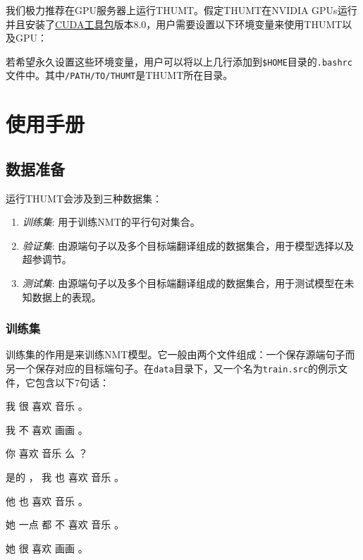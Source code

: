 \documentclass{article}
\begin{document}
我们极力推荐在GPU服务器上运行THUMT。假定THUMT在NVIDIA GPUs运行并且安装了\href{https://developer.nvidia.com/cuda-toolkit}{CUDA工具包}版本8.0，用户需要设置以下环境变量来使用THUMT以及GPU：

若希望永久设置这些环境变量，用户可以将以上几行添加到\verb|$HOME|目录的\verb|.bashrc|文件中。其中\verb|/PATH/TO/THUMT|是THUMT所在目录。

\section{使用手册}

\subsection{数据准备}

运行THUMT会涉及到三种数据集：
\begin{enumerate}
\item {\em 训练集}: 用于训练NMT的平行句对集合。
\item {\em 验证集}: 由源端句子以及多个目标端翻译组成的数据集合，用于模型选择以及超参调节。
\item {\em 测试集}: 由源端句子以及多个目标端翻译组成的数据集合，用于测试模型在未知数据上的表现。
\end{enumerate}

\subsubsection{训练集}

训练集的作用是来训练NMT模型。它一般由两个文件组成：一个保存源端句子而另一个保存对应的目标端句子。在\verb|data|目录下，又一个名为\verb|train.src|的例示文件，它包含以下7句话：
\begin{everbatim}
我 很 喜欢 音乐 。

我 不 喜欢 画画 。

你 喜欢 音乐 么 ？

是的 ， 我 也 喜欢 音乐 。

他 也 喜欢 音乐 。

她 一点 都 不 喜欢 音乐 。

她 很 喜欢 画画 。

\end{everbatim}
\end{document}

